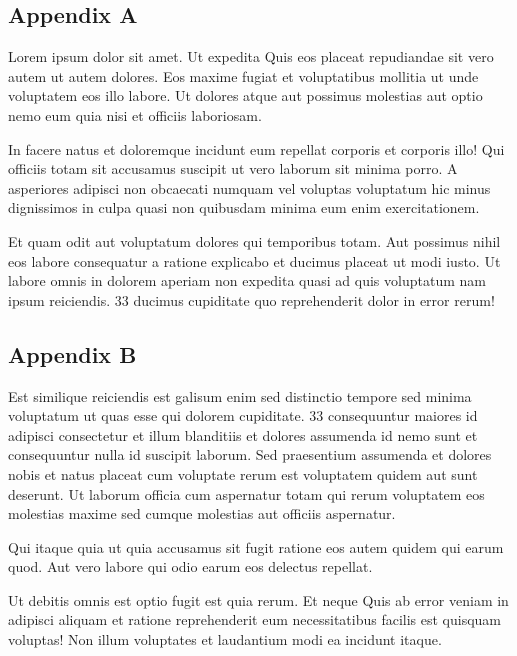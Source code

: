 \documentclass[12pt]{article}
\begin{document}
\subsection{Appendix A}

Lorem ipsum dolor sit amet. Ut expedita Quis eos placeat repudiandae sit vero autem ut autem dolores. Eos maxime fugiat et voluptatibus mollitia ut unde voluptatem eos illo labore. Ut dolores atque aut possimus molestias aut optio nemo eum quia nisi et officiis laboriosam.

In facere natus et doloremque incidunt eum repellat corporis et corporis illo! Qui officiis totam sit accusamus suscipit ut vero laborum sit minima porro. A asperiores adipisci non obcaecati numquam vel voluptas voluptatum hic minus dignissimos in culpa quasi non quibusdam minima eum enim exercitationem.

Et quam odit aut voluptatum dolores qui temporibus totam. Aut possimus nihil eos labore consequatur a ratione explicabo et ducimus placeat ut modi iusto. Ut labore omnis in dolorem aperiam non expedita quasi ad quis voluptatum nam ipsum reiciendis. 33 ducimus cupiditate quo reprehenderit dolor in error rerum!

\newpage

\subsection{Appendix B}

Est similique reiciendis est galisum enim sed distinctio tempore sed minima voluptatum ut quas esse qui dolorem cupiditate. 33 consequuntur maiores id adipisci consectetur et illum blanditiis et dolores assumenda id nemo sunt et consequuntur nulla id suscipit laborum. Sed praesentium assumenda et dolores nobis et natus placeat cum voluptate rerum est voluptatem quidem aut sunt deserunt. Ut laborum officia cum aspernatur totam qui rerum voluptatem eos molestias maxime sed cumque molestias aut officiis aspernatur.

Qui itaque quia ut quia accusamus sit fugit ratione eos autem quidem qui earum quod. Aut vero labore qui odio earum eos delectus repellat.

Ut debitis omnis est optio fugit est quia rerum. Et neque Quis ab error veniam in adipisci aliquam et ratione reprehenderit eum necessitatibus facilis est quisquam voluptas! Non illum voluptates et laudantium modi ea incidunt itaque.
\end{document}
